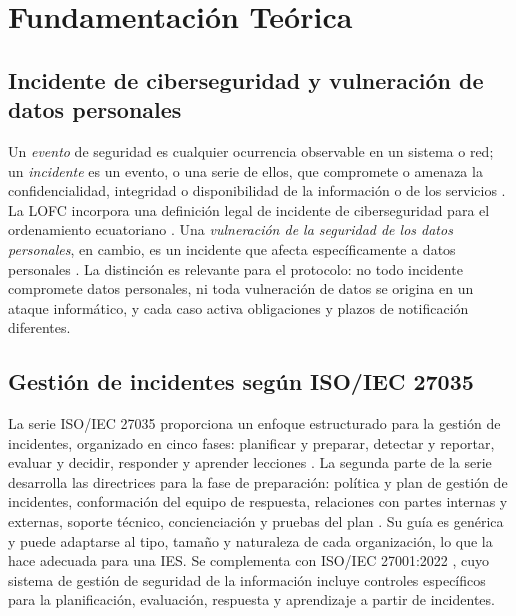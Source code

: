 \section{Fundamentación Teórica}

\subsection{Incidente de ciberseguridad y vulneración de datos personales}
Un \textit{evento} de seguridad es cualquier ocurrencia observable en un sistema o red; un \textit{incidente} es un evento, o una serie de ellos, que compromete o amenaza la confidencialidad, integridad o disponibilidad de la información o de los servicios \cite{iso27035_2023}. La LOFC incorpora una definición legal de incidente de ciberseguridad para el ordenamiento ecuatoriano \cite{lofc2026}. Una \textit{vulneración de la seguridad de los datos personales}, en cambio, es un incidente que afecta específicamente a datos personales \cite{lopdp2021}. La distinción es relevante para el protocolo: no todo incidente compromete datos personales, ni toda vulneración de datos se origina en un ataque informático, y cada caso activa obligaciones y plazos de notificación diferentes.

\subsection{Gestión de incidentes según ISO/IEC 27035}
La serie ISO/IEC 27035 proporciona un enfoque estructurado para la gestión de incidentes, organizado en cinco fases: planificar y preparar, detectar y reportar, evaluar y decidir, responder y aprender lecciones \cite{iso27035_2023}. La segunda parte de la serie desarrolla las directrices para la fase de preparación: política y plan de gestión de incidentes, conformación del equipo de respuesta, relaciones con partes internas y externas, soporte técnico, concienciación y pruebas del plan \cite{iso27035_2_2023}. Su guía es genérica y puede adaptarse al tipo, tamaño y naturaleza de cada organización, lo que la hace adecuada para una IES. Se complementa con ISO/IEC 27001:2022 \cite{iso27001_2022}, cuyo sistema de gestión de seguridad de la información incluye controles específicos para la planificación, evaluación, respuesta y aprendizaje a partir de incidentes.

